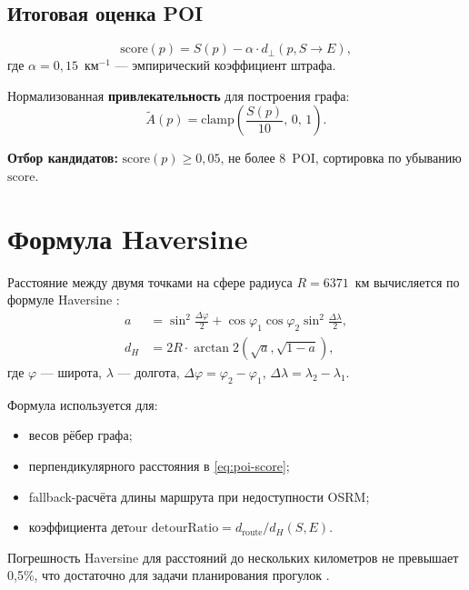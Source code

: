 \subsection{Итоговая оценка POI}

\begin{equation}
  \mathrm{score}(p) = S(p) - \alpha \cdot d_\perp(p, S \to E),
  \label{eq:poi-score}
\end{equation}
где $\alpha = 0{,}15$~км$^{-1}$ --- эмпирический коэффициент штрафа.

Нормализованная \textbf{привлекательность} для построения графа:
\begin{equation}
  \tilde{A}(p) = \mathrm{clamp}\!\left(\frac{S(p)}{10},\, 0,\, 1\right).
  \label{eq:attractiveness}
\end{equation}

\textbf{Отбор кандидатов:} $\mathrm{score}(p) \geq 0{,}05$, не более 8~POI,
сортировка по убыванию $\mathrm{score}$.

\section{Формула Haversine}
\label{sec:haversine}

Расстояние между двумя точками на сфере радиуса $R = 6371$~км вычисляется по
формуле Haversine \cite{sinnot1984,snyder1987}:
\begin{align}
  a &= \sin^2\!\frac{\Delta\varphi}{2} +
       \cos\varphi_1 \cos\varphi_2 \sin^2\!\frac{\Delta\lambda}{2},
       \label{eq:haversine-a} \\
  d_H &= 2R \cdot \arctan2(\sqrt{a}, \sqrt{1 - a}),
  \label{eq:haversine-d}
\end{align}
где $\varphi$ --- широта, $\lambda$ --- долгота, $\Delta\varphi = \varphi_2 - \varphi_1$,
$\Delta\lambda = \lambda_2 - \lambda_1$.

Формула используется для:
\begin{itemize}
  \item весов рёбер графа;
  \item перпендикулярного расстояния в \eqref{eq:poi-score};
  \item fallback-расчёта длины маршрута при недоступности OSRM;
  \item коэффициента детour $\mathrm{detourRatio} = d_{\mathrm{route}} / d_H(S, E)$.
\end{itemize}

Погрешность Haversine для расстояний до нескольких километров не превышает 0{,}5\%,
что достаточно для задачи планирования прогулок \cite{karney2013}.

